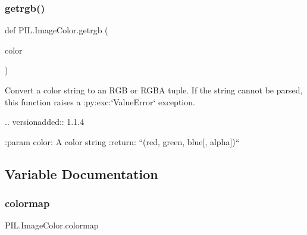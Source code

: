 \subsubsection{\texorpdfstring{getrgb()}{getrgb()}}
{\footnotesize\ttfamily def P\+I\+L.\+Image\+Color.\+getrgb (\begin{DoxyParamCaption}\item[{}]{color }\end{DoxyParamCaption})}

\begin{DoxyVerb} Convert a color string to an RGB or RGBA tuple. If the string cannot be
 parsed, this function raises a :py:exc:`ValueError` exception.

.. versionadded:: 1.1.4

:param color: A color string
:return: ``(red, green, blue[, alpha])``
\end{DoxyVerb}
 

\subsection{Variable Documentation}
\mbox{\label{namespacePIL_1_1ImageColor_a7762e8540878b08633ccd38bf0494a9c}} 
\subsubsection{\texorpdfstring{colormap}{colormap}}
{\footnotesize\ttfamily P\+I\+L.\+Image\+Color.\+colormap}

